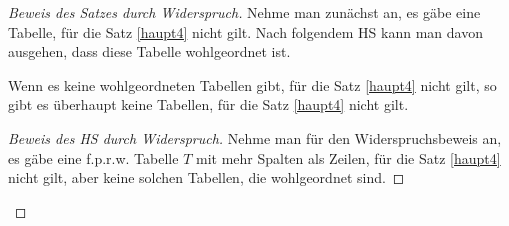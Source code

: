 \begin{proof}[Beweis des Satzes durch Widerspruch]
    Nehme man zunächst an, es gäbe eine Tabelle, für die Satz \ref{haupt4} nicht gilt. Nach folgendem HS kann man 
    davon ausgehen, dass diese Tabelle wohlgeordnet ist.
    \begin{lem}\label{fallbeschrank}
        Wenn es keine wohlgeordneten Tabellen gibt, für die Satz \ref{haupt4} nicht gilt, so gibt es überhaupt keine 
        Tabellen, für die Satz \ref{haupt4} nicht gilt.
    \end{lem}
    \begin{proof}[Beweis des HS durch Widerspruch]
        Nehme man für den Widerspruchsbeweis an, es gäbe eine f.p.r.w. Tabelle $T$ mit mehr Spalten als Zeilen, für 
        die Satz \ref{haupt4} nicht gilt, aber keine solchen Tabellen, die wohlgeordnet sind. 


\end{proof}
\end{proof}
